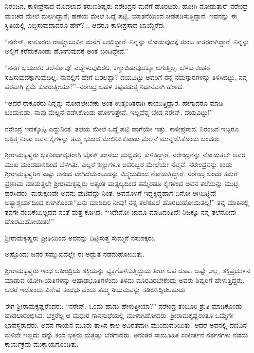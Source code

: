 ನಿರಂಜನ, ಕಾಳೀಪ್ರಸಾದ ಮೊದಲಾದ ತರುಣಶಿಷ್ಯರು ನರೇಂದ್ರನ ಮನೆಗೆ ಹೊರಟರು. ಹೋಗಿ ನೋಡುತ್ತಾರೆ–ನರೇಂದ್ರ ಮಂಚದ ಮೇಲೆ ಮಲಗಿದ್ದಾನೆ; ಹಣೆಯ ಮೇಲೆ ಒದ್ದೆ ಪಟ್ಟಿ. ಯಾತನೆಯಿಂದ ಚಡಪಡಿಸುತ್ತಿದ್ದಾನೆ. ಇವನನ್ನು ಈ ಸ್ಥಿತಿಯಲ್ಲಿ ಎಬ್ಬಿಸುವುದಾದರೂ ಹೇಗೆ?... ಆದರೂ ಕಾಳೀಪ್ರಸಾದ ಬಾಯ್ದೆರೆದ:

“ನರೇನ್, ಠಾಕೂರರು ರಾಮ್ಬಾಬುವಿನ ಮನೆಗೆ ಬಂದಿದ್ದಾರೆ. ನಿನ್ನನ್ನು ನೋಡುವುದಕ್ಕೆ ತುಂಬ ಕಾತರರಾಗಿದ್ದಾರೆ. ನಿನ್ನನ್ನು ಅಲ್ಲಿಗೆ ಕರೆದುಕೊಂಡು ಹೋಗುವುದಕ್ಕೆ ಅಂತ ಬಂದಿದ್ದೇವೆ.”

“ನನಗೆ ಭಯಂಕರ ತಲೆನೋವು! ಎದ್ದೇಳುವುದಿರಲಿ, ಕಣ್ಣುಬಿಡುವುದಕ್ಕೂ ಆಗುತ್ತಿಲ್ಲ. ಬೆಳಕು ಕಂಡರೆ ಸಹಿಸುವುದಕ್ಕಾಗುವುದಿಲ್ಲ. ನಾನಲ್ಲಿಗೆ ಹೇಗೆ ಬರಲಪ್ಪಾ? ದಯವಿಟ್ಟು ಅವರಿಗೆ ನನ್ನ ನಮಸ್ಕಾರಗಳನ್ನು ತಿಳಿಸಿಬಿಟ್ಟು, ನನ್ನ ಪರವಾಗಿ ಕ್ಷಮೆ ಕೋರುತ್ತೀಯಾ?”–ನರೇಂದ್ರ ಬಹಳ ಕಷ್ಟಪಡುತ್ತ ನಿಧಾನವಾಗಿ ಹೇಳಿದ.

“ಆದರೆ ಠಾಕೂರರು ನಿನ್ನನ್ನು ನೋಡಲೇಬೇಕು ಅಂತ ಉತ್ಕಂಠಿತರಾಗಿ ಕಾಯುತ್ತಿದ್ದಾರೆ. ಹೇಗಾದರೂ ಮಾಡಿ ಬಂದುಬಿಡು. ನಾವು ಮೆಲ್ಲನೆ ನಡೆಸಿಕೊಂಡು ಹೋಗುತ್ತೇವೆ. ಇಲ್ಲವೆನ್ನ ಬೇಡ ನರೇನ್, ದಯವಿಟ್ಟು!”

ನರೇಂದ್ರ ಇದಕ್ಕೊಪ್ಪಿ ಎದ್ದುನಿಂತ. ತಲೆಯ ಮೇಲೆ ಒದ್ದೆ ಪಟ್ಟಿ ಹಾಗೆಯೇ ಇತ್ತು. ಕಾಳೀಪ್ರಸಾದ, ನಿರಂಜನ ಇಬ್ಬರೂ ಅತ್ತಿತ್ತ ನಿಂತು ಅವನ ಕೈಗಳನ್ನು ತಮ್ಮ ಭುಜದ ಮೇಲಿರಿಸಿಕೊಂಡು ಮೆಲ್ಲನೆ ಮುನ್ನಡೆಸಿಕೊಂಡು ಬಂದರು.

ಶ್ರೀರಾಮಕೃಷ್ಣರು ಭಕ್ತರಿಂದಾವೃತರಾಗಿ ಬೈಠಕ್ ಖಾನೆಯ ಮಧ್ಯದಲ್ಲಿ ಕುಳಿತಿದ್ದಾರೆ. ನರೇಂದ್ರನನ್ನು ನೋಡುತ್ತಲೇ ಅವರ ಮುಖ ಮಂದಹಾಸದಿಂದ ಬೆಳಗಿತು. ಎಲ್ಲರ ಕಣ್ಣುಗಳೂ ಅವರಿಬ್ಬರ ಮೇಲೆಯೇ ನೆಟ್ಚಿವೆ. ನರೇಂದ್ರನನ್ನು ಕಂಡು ಶ್ರೀರಾಮಕೃಷ್ಣರಿಗೆ ಎಷ್ಟು ಆನಂದ ವಾಗಿದೆಯೆಂಬುದನ್ನು ವಿಸ್ಮಯದಿಂದ ನೋಡುತ್ತಿದ್ದಾರೆ. ನರೇಂದ್ರ ಬಂದು ತಮಗೆ ಪ್ರಣಾಮ ಮಾಡುತ್ತಲೇ ಶ್ರೀರಾಮಕೃಷ್ಣರು ಅತ್ಯಂತ ವಾತ್ಸಲ್ಯದಿಂದ ತಮ್ಮೆರಡೂ ಕೈಗಳಿಂದ ಅವನ ತಲೆಯನ್ನು ಮುಟ್ಟಿ ಹರಸಿದರು. ಮರುಕ್ಷಣವೇ ಅವನು ಪುಟಿದೆದ್ದು ನಿಂತ. ಅವನೊಳಗೆ ಇದ್ದಕ್ಕಿದ್ದಹಾಗೆ ಏನೋ ಆಗಿಬಿಟ್ಟಿದೆ! ಅತ್ಯಾಶ್ಚರ್ಯದಿಂದ ಕೂಗಿಕೊಂಡ:“ಏನು ಮಾಡಿದಿರಿ ನೀವು! ನನ್ನ ತಲೆಶೂಲೆ ಹೊರಟುಹೋಯಿತಲ್ಲ!” ತನ್ನ ಮಾತಿನಲ್ಲಿ ತನಗೇ ನಂಬಿಕೆಯಿಲ್ಲದವ ನಂತೆ ಮತ್ತೆ ಕೂಗಿದ: “ಇದೇನೋ ಜಾದೂ ಮಾಡಿದಂತಿದೆ! ನಿಜಕ್ಕೂ ನನ್ನ ತಲೆನೋವು ಹೊರಟುಹೋಯಿತು!”

ಶ್ರೀರಾಮಕೃಷ್ಣರು ಪ್ರೀತಿಯಿಂದ ಅವನನ್ನು ದಿಟ್ಟಿಸುತ್ತ ಸುಮ್ಮನೆ ನಸುನಕ್ಕರು.

ಅಷ್ಟೊಂದು ಜನರ ಸಮ್ಮುಖದಲ್ಲೇ ಈ ಅದ್ಭುತ ನಡೆದುಹೋಯಿತು.

ಶ್ರೀರಾಮಕೃಷ್ಣರು ಇಂಥ ಅತೀಂದ್ರಿಯ ಶಕ್ತಿಯನ್ನು ವ್ಯಕ್ತಗೊಳಿಸುತ್ತಿದ್ದುದು ತೀರಾ ಅಪ ರೂಪ. ಅಷ್ಟೇ ಅಲ್ಲ, ಶಕ್ತಿಪ್ರದರ್ಶನ ಮಾಡುವ ಯೋಗಿ-ಯತಿಗಳನ್ನು ಆಷಾಢಭೂತಿಗಳೆಂದು ತಿಳಿದು ದೂರವಿರಬೇಕೆಂದು ಅವರು ಶಿಷ್ಯರಿಗೆ ಹೇಳುತ್ತಿದ್ದರು. ಆದರೆ ಇದೊಂದು ವಿಶೇಷ ಸಂದರ್ಭವೆಂದು ತಮ್ಮ ನಿಯಮವನ್ನು ಸಡಿಲಿಸಿದ್ದಿರಬಹುದು.

ಈಗ ಶ್ರೀರಾಮಕೃಷ್ಣರೆಂದರು: “ನರೇನ್, ಒಂದು ಹಾಡು ಹೇಳುತ್ತೀಯಾ?” ನರೇಂದ್ರ ತಂಬೂರಿ ಶ್ರುತಿ ಮಾಡಿಕೊಂಡು ಹಾಡಲಾರಂಭಿಸಿದ. ಭಕ್ತರೆಲ್ಲ ಆ ಮಧುರ ಗಾನಸುಧೆಯಲ್ಲಿ ಮುಳುಗಿಹೋದರು. ಶ್ರೀರಾಮಕೃಷ್ಣರಂತೂ ಒಮ್ಮೆಗೇ ಭಾವಸ್ಥರಾದರು. ಅವನ ಗಾಯನ ಮೂರು ತಾಸಿನ ಕಾಲ ಅವಿರತವಾಗಿ ಮುಂದುವರಿಯಿತು. ಆದರೆ ಅವನಲ್ಲಿ ದಣಿವಿನ ಸುಳಿವೇ ಇಲ್ಲದು ದನ್ನು ಕಂಡ ಭಕ್ತರು ಮತ್ತಷ್ಟು ಬೆರಗಾದರು. ಅನಂತರ ಸಾಮೂಹಿಕ ಸಂಕೀರ್ತನೆ ನರ್ತನಗಳು ನಡೆದು ಕಾರ್ಯಕ್ರಮ ಮುಕ್ತಾಯಗೊಂಡಿತು.

